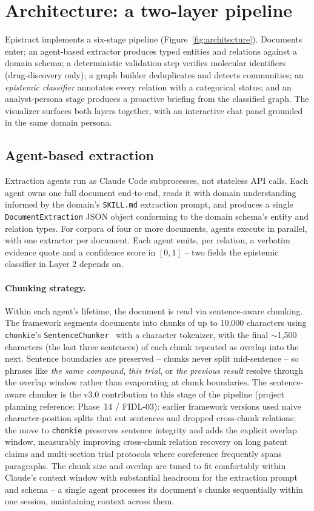 \section{Architecture: a two-layer pipeline}
\label{sec:architecture}

Epistract implements a six-stage pipeline (Figure~\ref{fig:architecture}). Documents enter; an agent-based extractor produces typed entities and relations against a domain schema; a deterministic validation step verifies molecular identifiers (drug-discovery only); a graph builder deduplicates and detects communities; an \emph{epistemic classifier} annotates every relation with a categorical status; and an analyst-persona stage produces a proactive briefing from the classified graph. The visualizer surfaces both layers together, with an interactive chat panel grounded in the same domain persona.

\subsection{Agent-based extraction}

Extraction agents run as Claude Code subprocesses, not stateless API calls. Each agent owns one full document end-to-end, reads it with domain understanding informed by the domain's \texttt{SKILL.md} extraction prompt, and produces a single \texttt{DocumentExtraction} JSON object conforming to the domain schema's entity and relation types. For corpora of four or more documents, agents execute in parallel, with one extractor per document. Each agent emits, per relation, a verbatim evidence quote and a confidence score in $[0, 1]$ -- two fields the epistemic classifier in Layer 2 depends on.

\paragraph{Chunking strategy.} Within each agent's lifetime, the document is read via sentence-aware chunking. The framework segments documents into chunks of up to 10{,}000 characters using \texttt{chonkie}'s \texttt{SentenceChunker}~\cite{chonkie2024} with a character tokenizer, with the final $\sim$1{,}500 characters (the last three sentences) of each chunk repeated as overlap into the next. Sentence boundaries are preserved -- chunks never split mid-sentence -- so phrases like \emph{the same compound}, \emph{this trial}, or \emph{the previous result} resolve through the overlap window rather than evaporating at chunk boundaries. The sentence-aware chunker is the v3.0 contribution to this stage of the pipeline (project planning reference: Phase~14 / FIDL-03): earlier framework versions used naive character-position splits that cut sentences and dropped cross-chunk relations; the move to \texttt{chonkie} preserves sentence integrity and adds the explicit overlap window, measurably improving cross-chunk relation recovery on long patent claims and multi-section trial protocols where coreference frequently spans paragraphs. The chunk size and overlap are tuned to fit comfortably within Claude's context window with substantial headroom for the extraction prompt and schema -- a single agent processes its document's chunks sequentially within one session, maintaining context across them.

